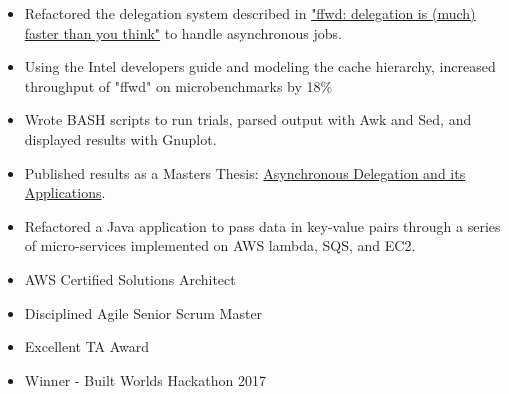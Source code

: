 \documentclass[10pt,letter,ragged2e]{maltacv}
\begin{document}
\smallskip
\begin{itemize}
  \item Refactored the delegation system described in \href{https://www.cs.uic.edu/~jakob/papers/sosp17_techrep_draft.pdf}{"ffwd: delegation is (much) faster than you think"} to handle asynchronous jobs.
  \item Using the Intel developers guide and modeling the cache hierarchy, increased throughput of "ffwd" on microbenchmarks by 18\%
  \item Wrote BASH scripts to run trials, parsed output with Awk and Sed, and displayed results with Gnuplot.
  \item Published results as a Masters Thesis: \href{https://indigo.uic.edu/articles/thesis/Asynchronous_Delegation_and_Applications/12481784}{Asynchronous Delegation and its Applications}. 
\end{itemize}

\divider

\smallskip
\begin{itemize}
  \item Refactored a Java application to pass data in key-value pairs through a series of micro-services implemented on AWS lambda, SQS, and EC2.
\end{itemize}

\divider

\medskip
\begin{itemize}
  \item AWS Certified Solutions Architect
  \item Disciplined Agile Senior Scrum Master
  \item Excellent TA Award
  \item Winner - Built Worlds Hackathon 2017
\end{itemize}

\medskip
{}
\medskip
\begin{multicols}{2}

  \vfill\null
  \columnbreak

  \vfill\null

\end{multicols}
\end{document}
